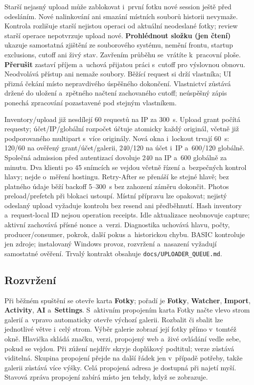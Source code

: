 \documentclass[11pt,a4paper]{article}
\newcommand{\ui}[1]{\textbf{#1}}
\begin{document}
Starší nejasný upload může zablokovat i~první fotku nové session ještě
před odesláním. Nové nalinkování ani smazání místních souborů historii
nevymaže. Kontrola rozlišuje starší nejistou operaci od aktuální
neodeslané fotky; review starší operace nepotvrzuje upload nové.
\ui{Prohlédnout složku (jen čtení)} ukazuje samostatná zjištění ze
souborového systému, nemění frontu, startup exclusions, cutoff ani živý stav.
Zavřením průběhu se~vrátíte k~pracovní ploše. \ui{Přerušit}
zastaví příjem a~uchová přijatou práci s~cutoff pro výslovnou obnovu.
Neodvolává přístup ani nemaže soubory. Běžící request si drží vlastníka;
UI přizná čekání místo nepravdivého úspěšného dokončení.
Vlastnictví zůstává držené do uložení a~zpětného načtení zachovaného cutoff;
neúspěšný zápis ponechá zpracování pozastavené pod stejným vlastníkem.

Inventory/upload již nesdílejí 60 requestů na IP za 300~s.
Upload grant počítá requesty; účet/IP/globální rozpočet účtuje atomicky každý
originál, včetně již podporovaného multipart s~více originály.
Nová okna i~lockout trvají 60~s: 120/60 na ověřený grant/účet/galerii,
240/120 na účet i~IP a~600/120 globálně. Společná admission před autentizací
dovoluje 240 na IP a~600 globálně za minutu. Dva klienti po 45 snímcích se
vejdou včetně řízení a~bezpečných kontrol hlavy; nejde o~měření hostingu.
Retry-After se přenáší ke stejné hlavě; bez platného údaje běží backoff
5--300~s bez zahození záměru dokončit. Photos preload/prefetch při blokaci
ustoupí. Místní přípravu lze opakovat; nejistý odeslaný upload vyžaduje
kontrolu bez resend ani předběhnutí. Hash inventory a~request-local ID nejsou
operation receipts. Idle aktualizace neobnovuje capture; aktivní zachovává
přísné nonce a~verzi. Diagnostika uchovává hlavu, počty, producer/consumer,
pokrok, další pokus a~historickou chybu. BASIC kontroluje jen zdroje;
instalovaný Windows provoz, rozvržení a~nasazení vyžadují samostatné ověření.
Trvalý kontrakt obsahuje \texttt{docs/UPLOADER\_QUEUE.md}.

\subsection{Rozvržení}

Při běžném spuštění se otevře karta \ui{Fotky}; pořadí je \ui{Fotky},
\ui{Watcher}, \ui{Import}, \ui{Activity}, \ui{AI} a~\ui{Settings}.
S~aktivním propojením karta Fotky načte vlevo strom galerií a~vpravo
automaticky otevře výchozí galerii. Rozbalit či sbalit lze jednotlivé větve
i~celý strom. Výběr galerie zobrazí její fotky přímo v~tomtéž okně.
Hlavička skládá značku, verzi, propojený web a~živé ovládání vedle sebe,
pokud se vejdou. Při zúžení nejdřív skryje doplňkový podtitul; verze zůstává
viditelná. Skupina propojení přejde na další řádek jen v~případě potřeby,
takže galerii zůstává více výšky. Celá propojená adresa je dostupná při
najetí myší. Stavová zpráva propojení zabírá místo jen tehdy, když se zobrazuje.
\end{document}
